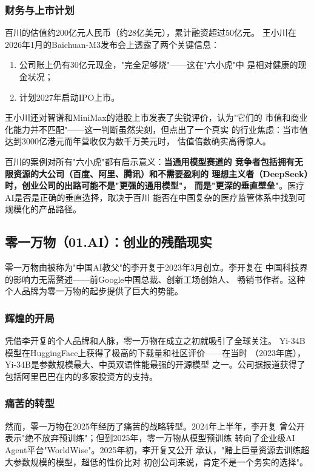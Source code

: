 \subsubsection{财务与上市计划}
百川的估值约200亿元人民币（约28亿美元），累计融资超过50亿元。
王小川在2026年1月的Baichuan-M3发布会上透露了两个关键信息：
\begin{enumerate}
  \item 公司账上仍有30亿元现金，"完全足够烧"——这在"六小虎"中
    是相对健康的现金状况；
  \item 计划2027年启动IPO上市。
\end{enumerate}

王小川还对智谱和MiniMax的港股上市发表了尖锐评价，认为"它们的
市值和商业化能力并不匹配"——这一判断虽然尖刻，但点出了一个真实
的行业焦虑：当市值达到3000亿港元而年营收仅为数千万美元时，
估值倍数确实高得惊人。

百川的案例对所有"六小虎"都有启示意义：\textbf{当通用模型赛道的
竞争者包括拥有无限资源的大公司（百度、阿里、腾讯）和不需要盈利的
理想主义者（DeepSeek）时，创业公司的出路可能不是"更强的通用模型"，
而是"更深的垂直壁垒"}。医疗AI是否是正确的垂直选择，取决于百川
能否在中国复杂的医疗监管体系中找到可规模化的产品路径。

\subsection{零一万物（01.AI）：创业的残酷现实}
\label{subsec:01ai}

零一万物由被称为"中国AI教父"的李开复于2023年3月创立。李开复在
中国科技界的影响力无需赘述——前Google中国总裁、创新工场创始人、
畅销书作者。这种个人品牌为零一万物的起步提供了巨大的势能。

\subsubsection{辉煌的开局}
凭借李开复的个人品牌和人脉，零一万物在成立之初就吸引了全球关注。
Yi-34B模型在HuggingFace上获得了极高的下载量和社区评价——在当时
（2023年底），Yi-34B是参数规模最大、中英双语性能最强的开源模型
之一。公司据报道获得了包括阿里巴巴在内的多家投资方的支持。

\subsubsection{痛苦的转型}
然而，零一万物在2025年经历了痛苦的战略转型。2024年上半年，李开复
曾公开表示"绝不放弃预训练"；但到2025年，零一万物从模型预训练
转向了企业级AI Agent平台"WorldWise"。2025年初，李开复又公开
承认，"赌上巨量资源去训练超大参数规模的模型，超低的性价比对
初创公司来说，肯定不是一个务实的选择"。

